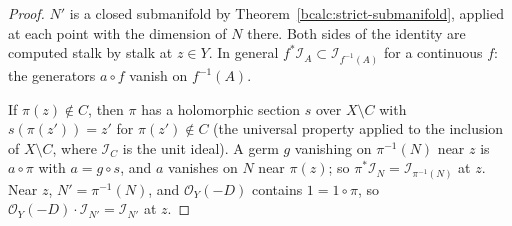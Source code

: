 \begin{proof}
\leanok
\(N'\) is a closed submanifold by Theorem~\ref{bcalc:strict-submanifold}, applied at each point with the dimension of \(N\) there.
Both sides of the identity are computed stalk by stalk at \(z\in Y\). In general \(f^*\mathcal I_A\subset\mathcal I_{f^{-1}(A)}\) for a
continuous \(f\): the generators \(a\circ f\) vanish on \(f^{-1}(A)\).

If \(\pi(z)\notin C\), then \(\pi\) has a holomorphic section \(s\) over \(X\setminus C\) with \(s(\pi(z'))=z'\) for \(\pi(z')\notin C\)
(the universal property applied to the inclusion of \(X\setminus C\), where \(\mathcal I_C\) is the unit ideal). A germ \(g\) vanishing on
\(\pi^{-1}(N)\) near \(z\) is \(a\circ\pi\) with \(a=g\circ s\), and \(a\) vanishes on \(N\) near \(\pi(z)\); so
\(\pi^*\mathcal I_N=\mathcal I_{\pi^{-1}(N)}\) at \(z\). Near \(z\), \(N'=\pi^{-1}(N)\), and \(\mathcal O_Y(-D)\) contains \(1=1\circ\pi\), so
\(\mathcal O_Y(-D)\cdot\mathcal I_{N'}=\mathcal I_{N'}\) at \(z\).


\end{proof}
